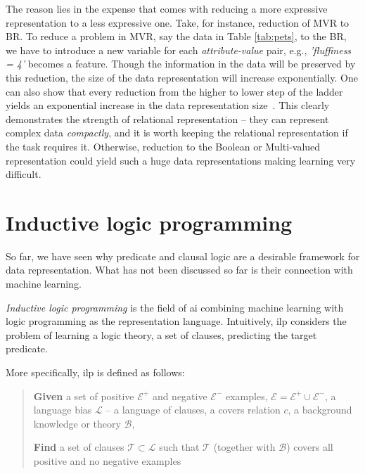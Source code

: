 The reason lies in the expense that comes with reducing a more expressive representation to a less expressive one.
Take, for instance, reduction of MVR to BR.
To reduce a problem in MVR, say the data in Table \ref{tab:pets}, to the BR, we have to introduce a new variable for each \textit{attribute-value} pair, e.g., \textit{'fluffiness = 4'} becomes a feature.
Though the information in the data will be preserved by this reduction, the size of the data representation will increase exponentially.
One can also show that every reduction from the higher to lower step of the ladder yields an exponential increase in the data representation size~\cite{LucRLbook}.
This clearly demonstrates the strength of relational representation -- they can represent complex data \textit{compactly}, and it is worth keeping the relational representation if the task requires it.
Otherwise, reduction to the Boolean or Multi-valued representation could yield such a huge data representations making learning very difficult.




\section{Inductive logic programming}


So far, we have seen why predicate and clausal logic are a desirable framework for data representation.
What has not been discussed so far is their connection with machine learning.


\textit{Inductive logic programming} \cite{LucRLbook,Lavrac:1993:ILP:562956} is the field of \gls{ai} combining machine learning with logic programming as the representation language.
Intuitively, \gls{ilp} considers the problem of learning a logic theory, a set of clauses, predicting the target predicate.

More specifically, \gls{ilp} is defined as follows:

\begin{quote}
	\textbf{Given}
	 a set of positive $\mathcal{E}^+$ and negative $\mathcal{E}^-$ examples, $\mathcal{E} = \mathcal{E}^+ \cup \mathcal{E}^-$,
	 a language bias $\mathcal{L}$ -- a language of clauses,
	 a covers relation $c$,
	 a background knowledge or theory $\mathcal{B}$,


	\textbf{Find} a set of clauses $\mathcal{T} \subset \mathcal{L}$ such that $\mathcal{T}$ (together with $\mathcal{B}$) covers all positive and no negative examples
\end{quote}

